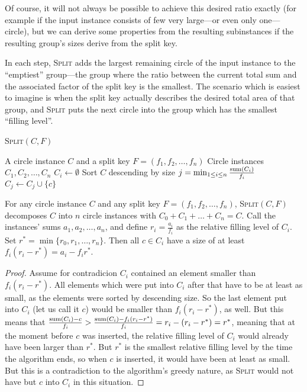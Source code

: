 \documentclass[%
    a4paper,              %
    style=screen,          %
    bibliography=totoc,   %
    nexus,                %
    lnum,                 %
    extramargin,          %
]{tubsbook}
\begin{document}
Of course, it will not always be possible to achieve this desired ratio exactly (for example if the input instance consists of few very large---or even only one---circle), but we can derive some properties from the resulting subinstances if the resulting group's sizes derive from the split key.

In each step, \textsc{Split} adds the largest remaining circle of the input instance to the “emptiest” group---the group where the ratio between the current total sum and the associated factor of the split key is the smallest. The scenario which is easiest to imagine is when the split key actually describes the desired total area of that group, and \textsc{Split} puts the next circle into the group which has the smallest “filling level”.

\begin{algorithm}[htbp!]
    \caption{\textsc{Split}$(C,F)$}
    \begin{algorithmic}
        \Require A circle instance $C$ and a split key $F = (f_1, f_2, \dots, f_n)$
        \Ensure Circle instances $C_1, C_2, \dots, C_n$
            \State $C_i \gets \emptyset$
        \EndFor
        \State Sort $C$ descending by size
            \State $j = \min_{1 \le i \le n} \frac{\operatorname{sum}(C_i)}{f_i}$
            \State $C_j \gets C_j \cup \{c\}$
        \EndFor
    \end{algorithmic}
\end{algorithm}

\begin{theorem}\label{th:split-property}
    For any circle instance $C$ and any split key $F = (f_1, f_2, \dots, f_n)$, \textsc{Split}$(C,F)$ decomposes $C$ into $n$ circle instances with $C_0 + C_1 + \dots + C_n = C$. 
    Call the instances' sums $a_1, a_2, \dots, a_n$, and define $r_i = \frac{a_i}{f_i}$ as the relative filling level of $C_i$.
    Set $r^* = \min\{r_0,r_1,\dots,r_n\}$.
    Then all $c \in C_i$ have a size of at least $f_i(r_i-r^*) = a_i - f_i r^*$.
\end{theorem}

\begin{proof}
    Assume for contradicion $C_i$ contained an element smaller than $f_i(r_i-r^*)$. All elements which were put into $C_i$ after that have to be at least as small, as the elements were sorted by descending size. So the last element put into $C_i$ (let us call it $c$) would be smaller than $f_i(r_i-r^*)$, as well.
    But this means that $\frac{\operatorname{sum}(C_i) - c}{f_i} > \frac{\operatorname{sum}(C_i) - f_i(r_i-r^*)}{f_i} = r_i - (r_i-r^*) = r^*$, meaning that at the moment before $c$ was inserted, the relative filling level of $C_i$ would already have been larger than $r^*$. But $r^*$ is the smallest relative filling level by the time the algorithm ends, so when $c$ is inserted, it would have been at least as small. But this is a contradiction to the algorithm's greedy nature, as \textsc{Split} would not have but $c$ into $C_i$ in this situation.
\end{proof}
\end{document}
